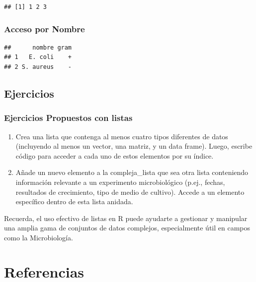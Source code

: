 \documentclass[
]{book}
\newenvironment{Shaded}{\begin{snugshade}}{\end{snugshade}}
\newcommand{\CommentTok}[1]{\textcolor[rgb]{0.56,0.35,0.01}{\textit{#1}}}
\newcommand{\FunctionTok}[1]{\textcolor[rgb]{0.13,0.29,0.53}{\textbf{#1}}}
\newcommand{\NormalTok}[1]{#1}
\newcommand{\OtherTok}[1]{\textcolor[rgb]{0.56,0.35,0.01}{#1}}
\newcommand{\SpecialCharTok}[1]{\textcolor[rgb]{0.81,0.36,0.00}{\textbf{#1}}}
\begin{document}
\begin{verbatim}
## [1] 1 2 3
\end{verbatim}

\hypertarget{acceso-por-nombre}{%
\subsection{Acceso por Nombre}\label{acceso-por-nombre}}

\begin{Shaded}
\end{Shaded}

\begin{verbatim}
##      nombre gram
## 1   E. coli    +
## 2 S. aureus    -
\end{verbatim}

\hypertarget{ejercicios-3}{%
\section{Ejercicios}\label{ejercicios-3}}

\hypertarget{ejercicios-propuestos-con-listas}{%
\subsection{Ejercicios Propuestos con listas}\label{ejercicios-propuestos-con-listas}}

\begin{enumerate}
\def\labelenumi{\arabic{enumi}.}
\item
  Crea una lista que contenga al menos cuatro tipos diferentes de datos (incluyendo al menos un vector, una matriz, y un data frame). Luego, escribe código para acceder a cada uno de estos elementos por su índice.
\item
  Añade un nuevo elemento a la compleja\_lista que sea otra lista conteniendo información relevante a un experimento microbiológico (p.ej., fechas, resultados de crecimiento, tipo de medio de cultivo). Accede a un elemento específico dentro de esta lista anidada.
\end{enumerate}

Recuerda, el uso efectivo de listas en R puede ayudarte a gestionar y manipular una amplia gama de conjuntos de datos complejos, especialmente útil en campos como la Microbiología.

\hypertarget{referencias}{%
\chapter{Referencias}\label{referencias}}

  
\end{document}

